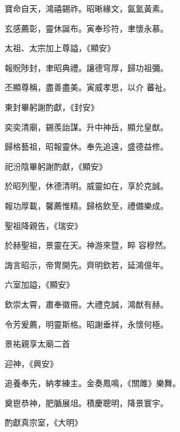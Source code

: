 \begin{pinyinscope}
 寶命自天，鴻禧錫祚。昭晰緣文，氤氳黃素。



 玄感薦彰，靈休誕布。寅奉珍符，聿懷永慕。



 太祖、太宗加上尊謚，《顯安》



 報貺陟封，聿昭典禮。讓德穹厚，歸功祖彌。



 丕顯尊稱，盡善盡美。寅威孝思，以介
 蕃祉。



 東封畢躬謝酌獻，《封安》



 奕奕清廟，錫羨詒謀。升中神岳，顯允皇猷。



 歸格藝祖，昭報靈休。奉先追遠，盛德益修。



 祀汾陰畢躬謝酌獻，《顯安》



 於昭列聖，休德清明。威靈如在，享於克誠。



 報功厚載，馨薦惟精。歸格飲至，禮備樂成。



 聖祖降親告，《瑞安》



 於赫聖祖，景靈在天。神游來暨，睟
 容穆然。



 誨言昭示，帝冑開先。齊明欽若，延鴻億年。



 六室加謚，《顯安》



 欽崇太霄，肅奉徽冊。大禮克誠，鴻猷有赫。



 令芳爰薦，明靈斯格。昭謝垂祥，永懷何極。



 景祐親享太廟二首



 迎神，《興安》



 追養奉先，納孝練主。金奏鳳鳴，《關雎》樂舞。



 奠鬯恭神，肥腯展俎。積慶聰明，降景寰宇。



 酌獻真宗室，《大明》




\end{pinyinscope}
